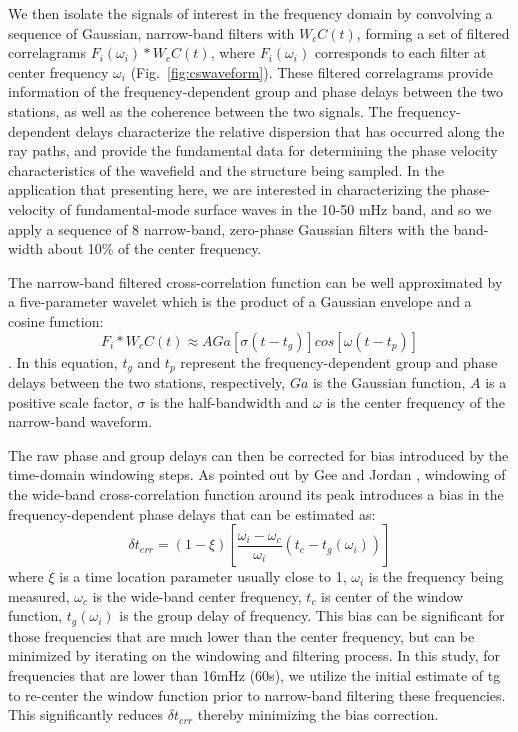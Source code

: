 \documentclass[referee]{gji}
\begin{document}
We then isolate the signals of interest in the frequency domain by convolving a sequence of Gaussian, narrow-band filters with $W_cC(t)$, forming a set of filtered correlagrams $F_i(\omega_i) \ast W_c C(t)$, where $F_i(\omega_i)$ corresponds to each filter at center frequency $\omega_i$ (Fig.~\ref{fig:cswaveform}). These filtered correlagrams provide information of the frequency-dependent group and phase delays between the two stations, as well as the coherence between the two signals. The frequency-dependent delays characterize the relative dispersion that has occurred along the ray paths, and provide the fundamental data for determining the phase velocity characteristics of the wavefield and the structure being sampled.  In the application that presenting here, we are interested in characterizing the phase-velocity of fundamental-mode surface waves in the 10-50 mHz band, and so we apply a sequence of 8 narrow-band, zero-phase Gaussian filters with the band-width about 10\% of the center frequency.


The narrow-band filtered cross-correlation function can be well approximated by a five-parameter wavelet which is the product of a Gaussian envelope and a cosine function:
\[
F_i \ast W_c C(t) \approx A Ga [\sigma(t-t_g)]cos[\omega(t-t_p)]
\]
\cite{Gee:1992ww}.  In this equation, $t_g$ and $t_p$ represent the frequency-dependent group and phase delays between the two stations, respectively, $Ga$ is the Gaussian function, $A$ is a positive scale factor, $\sigma$ is the half-bandwidth and $\omega$ is the center frequency of the narrow-band waveform.

The raw phase and group delays can then be corrected for bias introduced by the time-domain windowing steps.  As pointed out by Gee and Jordan , windowing of the wide-band cross-correlation function around its peak introduces a bias in the frequency-dependent phase delays that can be estimated as:
\[
\delta t_{err} = (1-\xi)\left[\frac{\omega_i - \omega_c}{\omega_i}\left(t_c - t_g(\omega_i)\right)\right]
\]
where $\xi$ is a time location parameter usually close to 1, $\omega_i$ is the frequency being measured, $\omega_c$ is the wide-band center frequency, $t_c$ is center of the window function, $t_g(\omega_i)$ is the group delay of frequency.  This bias can be significant for those frequencies that are much lower than the center frequency, but can be minimized by iterating on the windowing and filtering process.  In this study, for frequencies that are lower than 16mHz (60s), we utilize the initial estimate of tg to re-center the window function prior to narrow-band filtering these frequencies. This significantly reduces $\delta t_{err}$ thereby minimizing the bias correction.
\end{document}
